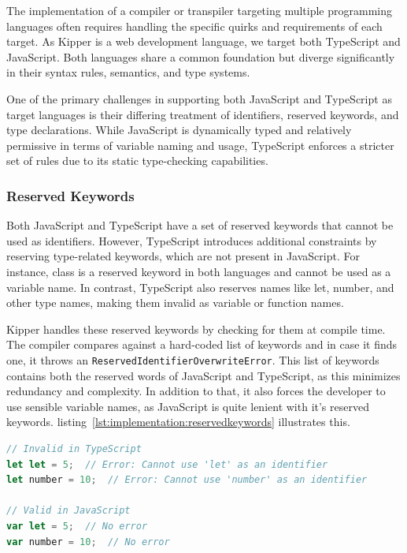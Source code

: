 The implementation of a compiler or transpiler targeting multiple programming languages often requires handling the specific quirks and requirements of each target. As Kipper is a web development language, we target both TypeScript and JavaScript. Both languages share a common foundation but diverge significantly in their syntax rules, semantics, and type systems.

One of the primary challenges in supporting both JavaScript and TypeScript as target languages is their differing treatment of identifiers, reserved keywords, and type declarations. While JavaScript is dynamically typed and relatively permissive in terms of variable naming and usage, TypeScript enforces a stricter set of rules due to its static type-checking capabilities.

\subsubsection{Reserved Keywords}

Both JavaScript and TypeScript have a set of reserved keywords that cannot be used as identifiers. However, TypeScript introduces additional constraints by reserving type-related keywords, which are not present in JavaScript. For instance, class is a reserved keyword in both languages and cannot be used as a variable name. In contrast, TypeScript also reserves names like let, number, and other type names, making them invalid as variable or function names.

Kipper handles these reserved keywords by checking for them at compile time. The compiler compares against a hard-coded list of keywords and in case it finds one, it throws an \lstinline|ReservedIdentifierOverwriteError|. This list of keywords contains both the reserved words of JavaScript and TypeScript, as this minimizes redundancy and complexity. In addition to that, it also forces the developer to use sensible variable names, as JavaScript is quite lenient with it's reserved keywords. listing~\ref{lst:implementation:reservedkeywords} illustrates this.

\begin{lstlisting}[language=TypeScript,caption=Reserved Keywords in TS and JS,label=lst:implementation:reservedkeywords]
// Invalid in TypeScript
let let = 5;  // Error: Cannot use 'let' as an identifier
let number = 10;  // Error: Cannot use 'number' as an identifier

// Valid in JavaScript
var let = 5;  // No error
var number = 10;  // No error
\end{lstlisting}


